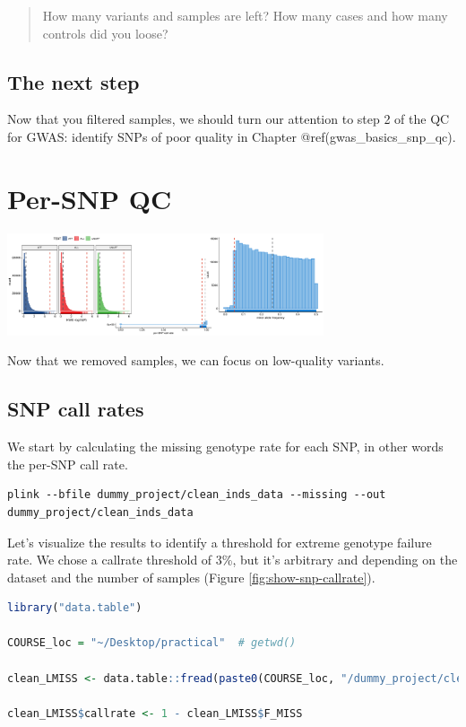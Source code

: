 \documentclass[
]{book}
\begin{document}
\begin{quote}
How many variants and samples are left? How many cases and how many controls did you loose?
\end{quote}

\hypertarget{the-next-step}{%
\section{The next step}\label{the-next-step}}

Now that you filtered samples, we should turn our attention to step 2 of the QC for GWAS: identify SNPs of poor quality in Chapter @ref(gwas\_basics\_snp\_qc).

\hypertarget{gwas_basics_snp_qc}{%
\chapter{Per-SNP QC}\label{gwas_basics_snp_qc}}

\includegraphics[width=0.7\textwidth,height=\textheight]{img/_gwas_dummy/gwas_snp_qc.png}

Now that we removed samples, we can focus on low-quality variants.

\hypertarget{snp-call-rates}{%
\section{SNP call rates}\label{snp-call-rates}}

We start by calculating the missing genotype rate for each SNP, in other words the per-SNP call rate.

\begin{lstlisting}
plink --bfile dummy_project/clean_inds_data --missing --out dummy_project/clean_inds_data
\end{lstlisting}

Let's visualize the results to identify a threshold for extreme genotype failure rate. We chose a callrate threshold of 3\%, but it's arbitrary and depending on the dataset and the number of samples (Figure \ref{fig:show-snp-callrate}).

\begin{lstlisting}[language=R]
library("data.table")

COURSE_loc = "~/Desktop/practical"  # getwd()

clean_LMISS <- data.table::fread(paste0(COURSE_loc, "/dummy_project/clean_inds_data.lmiss"))

clean_LMISS$callrate <- 1 - clean_LMISS$F_MISS
\end{lstlisting}
\end{document}
